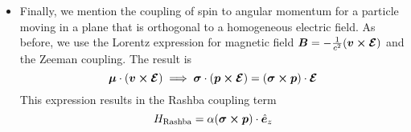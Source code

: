 \documentclass[11pt, a4paper]{article}
\renewcommand{\vec}[1]{\bm{#1}}  %
\newcommand{\uvec}[1]{\hat{\vec{#1}}}  %
\newcommand{\B}{\vec{B}}  %
\newcommand{\m}{\vec{\mu}}  %
\begin{document}
\begin{itemize}
	\item Finally, we mention the coupling of spin to angular momentum for a particle moving in a plane that is orthogonal to a homogeneous electric field. As before, we use the Lorentz expression for magnetic field $ \B = -\frac{1}{c^{2}}(\vec{v} \cross \vec{\mathcal{E}}) $ and the Zeeman coupling. The result is
	\begin{equation*}
		\m \cdot (\vec{v} \cross \vec{\mathcal{E}}) \implies \vec{\sigma} \cdot (\vec{p} \cross \vec{\mathcal{E}}) = (\vec{\sigma} \cross \vec{p}) \cdot \vec{\mathcal{E}}
	\end{equation*}
	This expression results in the Rashba coupling term
	\begin{equation*}
		H_{\text{Rashba}} = \alpha (\vec{\sigma} \cross \vec{p}) \cdot \uvec{e}_{z}
	\end{equation*}
\end{itemize}
\end{document}
